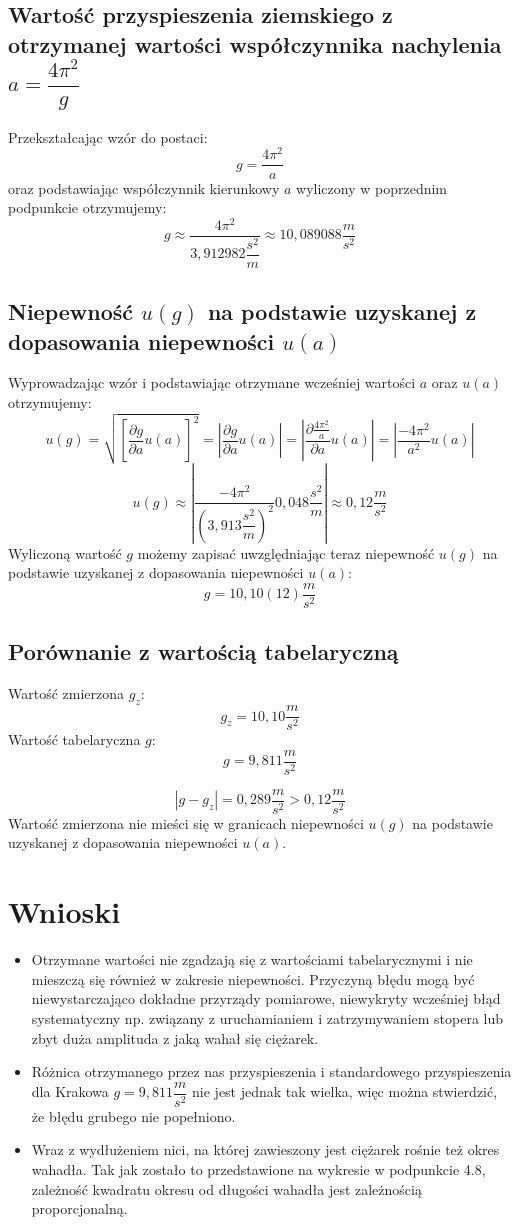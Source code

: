\documentclass[a4paper,11pt]{article}
\begin{document}
\subsection{Wartość przyspieszenia ziemskiego z otrzymanej wartości współczynnika nachylenia $a =\dfrac{4\pi^{2}}{g}$}
Przekształcając wzór do postaci:
$$g = \dfrac{4\pi^{2}}{a}$$
oraz podstawiając współczynnik kierunkowy $a$ wyliczony w poprzednim podpunkcie otrzymujemy:
$$g \approx \dfrac{4\pi^{2}}{3,912982\dfrac{s^{2}}{m}} \approx 10,089088\dfrac{m}{s^{2}}$$

\subsection{Niepewność $u(g)$ na podstawie uzyskanej z dopasowania niepewności $u(a)$}
Wyprowadzając wzór i podstawiając otrzymane wcześniej wartości $a$ oraz $u(a)$ otrzymujemy: 
$$u(g)=\sqrt{\left[\frac{\partial g}{\partial a}u(a)\right]^{2}}=\left|\frac{\partial g}{\partial a}u(a)\right|=\left|\frac{\partial\frac{4\pi^{2}}{a}}{\partial a}u(a)\right|=\left|\frac{-4\pi^{2}}{a^{2}}u(a)\right|$$
$$u(g)\approx\left|\frac{-4\pi^{2}}{ \left(3,913 \dfrac{s^{2}}{m}\right)^{2}}0,048 \dfrac{s^{2}}{m}\right| \approx 0,12\dfrac{m}{s^{2}}$$
Wyliczoną wartość $g$ możemy zapisać uwzględniając teraz niepewność $u(g)$ na podstawie uzyskanej z dopasowania niepewności $u(a)$:
$$g=10,10(12)\dfrac{m}{s^{2}}$$

\subsection{Porównanie z wartością tabelaryczną}
Wartość zmierzona $g_{z}$:
$$g_{z}= 10,10\dfrac{m}{s^{2}}$$
Wartość tabelaryczna $g$:
$$g= 9,811\dfrac{m}{s^{2}}$$

$$|g-g_{z}|=0,289\dfrac{m}{s^{2}}> 0,12\dfrac{m}{s^{2}}$$
Wartość zmierzona nie mieści się w granicach niepewności $u(g)$ na podstawie uzyskanej z dopasowania niepewności $u(a)$.

\section{Wnioski}
\begin{itemize}
\item Otrzymane wartości nie zgadzają się z wartościami tabelarycznymi i nie mieszczą się również w zakresie niepewności. Przyczyną błędu mogą być niewystarczająco dokładne przyrządy pomiarowe, niewykryty wcześniej błąd systematyczny np. związany z uruchamianiem i zatrzymywaniem stopera lub zbyt duża amplituda z jaką wahał się ciężarek.  
\item Różnica otrzymanego przez nas przyspieszenia i standardowego przyspieszenia dla Krakowa $g=9,811\dfrac{m}{s^{2}}$ nie jest jednak tak wielka, więc można stwierdzić, że błędu grubego nie popełniono.
\item Wraz z wydłużeniem nici, na której zawieszony jest ciężarek rośnie też okres wahadła. Tak jak zostało to przedstawione na wykresie w podpunkcie 4.8, zależność kwadratu okresu od długości wahadła jest zależnością proporcjonalną.
\end{itemize}
\end{document}
